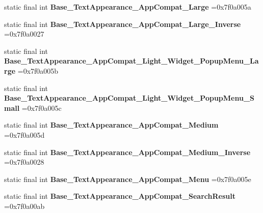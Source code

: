 \begin{DoxyCompactItemize}
\mbox{\label{classproject4_1_1xaria_1_1R_1_1style_a369dcce4898b5131d3a55b339af9707c}} 
static final int {\bfseries Base\+\_\+\+Text\+Appearance\+\_\+\+App\+Compat\+\_\+\+Large} =0x7f0a005a
\item 
\mbox{\label{classproject4_1_1xaria_1_1R_1_1style_a7c04e43273ade717223e126e36604e1f}} 
static final int {\bfseries Base\+\_\+\+Text\+Appearance\+\_\+\+App\+Compat\+\_\+\+Large\+\_\+\+Inverse} =0x7f0a0027
\item 
\mbox{\label{classproject4_1_1xaria_1_1R_1_1style_a9b6c88c793f2ded4c6ec691802ffdc82}} 
static final int {\bfseries Base\+\_\+\+Text\+Appearance\+\_\+\+App\+Compat\+\_\+\+Light\+\_\+\+Widget\+\_\+\+Popup\+Menu\+\_\+\+Large} =0x7f0a005b
\item 
\mbox{\label{classproject4_1_1xaria_1_1R_1_1style_a3988b8f7b8cfa46e081abd0e44733f05}} 
static final int {\bfseries Base\+\_\+\+Text\+Appearance\+\_\+\+App\+Compat\+\_\+\+Light\+\_\+\+Widget\+\_\+\+Popup\+Menu\+\_\+\+Small} =0x7f0a005c
\item 
\mbox{\label{classproject4_1_1xaria_1_1R_1_1style_a3b1c2f51a679053626987daef75b36c2}} 
static final int {\bfseries Base\+\_\+\+Text\+Appearance\+\_\+\+App\+Compat\+\_\+\+Medium} =0x7f0a005d
\item 
\mbox{\label{classproject4_1_1xaria_1_1R_1_1style_a2f5bdf9dd9cbaa69b8ae91214f73d8b1}} 
static final int {\bfseries Base\+\_\+\+Text\+Appearance\+\_\+\+App\+Compat\+\_\+\+Medium\+\_\+\+Inverse} =0x7f0a0028
\item 
\mbox{\label{classproject4_1_1xaria_1_1R_1_1style_af7af096cef71e4a100fa8872bc460972}} 
static final int {\bfseries Base\+\_\+\+Text\+Appearance\+\_\+\+App\+Compat\+\_\+\+Menu} =0x7f0a005e
\item 
\mbox{\label{classproject4_1_1xaria_1_1R_1_1style_acd7c7d07cb2e566073c333de96c22bc7}} 
static final int {\bfseries Base\+\_\+\+Text\+Appearance\+\_\+\+App\+Compat\+\_\+\+Search\+Result} =0x7f0a00ab

\end{DoxyCompactItemize}
